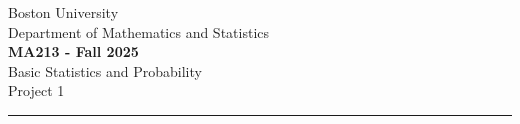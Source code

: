 \documentclass[12pt]{article}
\begin{document}
	
	
	
	\begin{center}		
        Boston University \\
        Department of Mathematics and Statistics \\ 
		\Large{\textbf{MA213 - Fall 2025}} \\ 
        \large{Basic Statistics and Probability} \\
        \large{Project 1} \\ 
		\noindent\rule{16cm}{2pt}
	\end{center}
	
	
\end{document}
